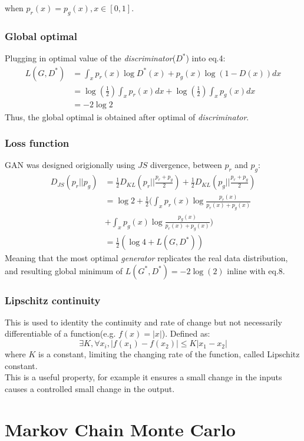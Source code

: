 \documentclass{article}
\begin{document}
{when $p_{r}(x) = p_{g}(x), x\in [0,1]$.
\subsubsection*{Global optimal}
Plugging in optimal value of the \textit{discriminator}($D^*$) into eq.4:
\begin{align}
    \textit{L}(G,D^*) &= \int_{x}p_{r}(x)\log{D^*(x)} + p_{g}(x)\log{(1-D(x))}dx \\
    &=\log(\frac{1}{2})\int_{x}p_{r}(x)dx + \log(\frac{1}{2})\int_{x}p_{g}(x)dx\\
    &=-2\log{2}
\end{align}
Thus, the global optimal is obtained after optimal of \textit{discriminator}.
\subsubsection*{Loss function}
GAN was designed origionally using $JS$ divergence, between $p_{r}$ and $p_{g}$:
\begin{align}
    D_{JS}(p_{r}||p_{g}) &= \frac{1}{2}D_{KL}(p_{r}||\frac{p_{r}+p_{g}}{2}) + \frac{1}{2}D_{KL}(p_{g}||\frac{p_{r}+p_{g}}{2}) \\
    &= \log{2} + \frac{1}{2}(\int_{x}p_{r}(x)\log{
        \frac{p_{r}(x)}{p_{r}(x)+p_{g}(x)}}\\
        &+\int_{x}p_{g}(x)\log{\frac{p_{g}(x)}{p_{r}(x)+p_{g}(x)}})\\
    &= \frac{1}{2}(\log{4}+L(G,D^*))    
\end{align}
Meaning that the most optimal \textit{generator} replicates the real data distribution, and resulting global minimum of $L(G^*,D^*) = -2\log(2)$ inline with eq.8.
\subsubsection*{Lipschitz continuity}
This is used to identity the continuity and rate of change but not necessarily differentiable of a function(e.g. $f(x) = |x|$). Defined as:
\[
\exists K, \forall x_{i}, |f(x_{1}) - f(x_{2})| \leq K|x_{1}-x_{2}|    
\]
where $K$ is a constant, limiting the changing rate of the function, called Lipschitz constant.\\
This is a useful property, for example it ensures a small change in the inputs causes a controlled small change in the output.
\section{Markov Chain Monte Carlo}
}
\end{document}
